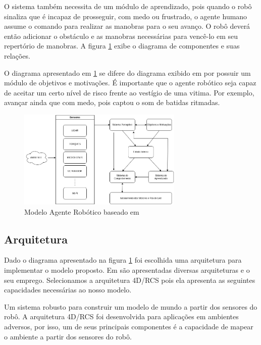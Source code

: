 \documentclass[
	article,			%
	10pt,				%
	oneside,			%
	a4paper,			%
	english,			%
	brazil,				%
	sumario=tradicional	
	]{abntex2}
\begin{document}
O sistema também necessita de um módulo de aprendizado, pois quando o robô sinaliza que é incapaz de prosseguir, com medo ou frustrado, o agente humano assume o comando para realizar as manobras para o seu avanço. O robô deverá então adicionar o obstáculo e as manobras necessárias para vencê-lo em seu repertório de manobras. A figura \ref{figure:componentes} exibe o diagrama de componentes e suas relações.

O diagrama apresentado em \ref{figure:componentes} se difere do diagrama exibido em  \cite{kim2002implementation} por possuir um módulo de objetivos e motivações. É importante que o agente robótico seja capaz de aceitar um certo nível de risco frente ao vestígio de uma vitima. Por exemplo, avançar ainda que com medo, pois captou o som de batidas ritmadas.


\begin{figure}
  \centering
  \includegraphics[width=0.7\textwidth]{modelo.png}
  \caption{Modelo Agente Robótico baseado em \cite{kim2002implementation}}
  \label{figure:componentes}
\end{figure}

\subsection{Arquitetura}

Dado o diagrama apresentado na figura \ref{figure:componentes} foi escolhida uma arquitetura para implementar o modelo proposto. Em \cite{kotseruba202040} são apresentadas diversas arquiteturas e o seu emprego. Selecionamos a arquitetura 4D/RCS pois ela apresenta as seguintes capacidades necessárias ao nosso modelo.

Um sistema robusto para construir um modelo de mundo a partir dos sensores do robô. A arquitetura 4D/RCS foi desenvolvida para aplicações em ambientes adversos, por isso, um de seus principais componentes é a capacidade de mapear o ambiente a partir dos sensores do robô.
\end{document}
